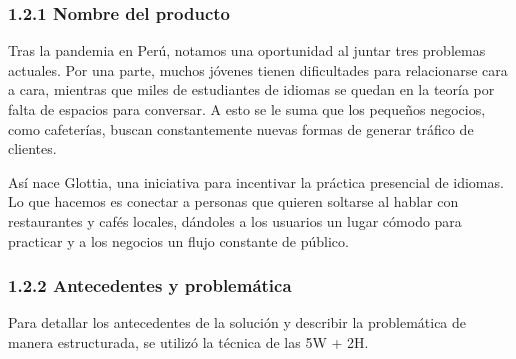 \subsubsection{1.2.1 Nombre del
producto}\label{report__10-cap1-introduccion.md__nombre-del-producto}

Tras la pandemia en Perú, notamos una oportunidad al juntar tres
problemas actuales. Por una parte, muchos jóvenes tienen dificultades
para relacionarse cara a cara, mientras que miles de estudiantes de
idiomas se quedan en la teoría por falta de espacios para conversar. A
esto se le suma que los pequeños negocios, como cafeterías, buscan
constantemente nuevas formas de generar tráfico de clientes.

Así nace Glottia, una iniciativa para incentivar la práctica presencial
de idiomas. Lo que hacemos es conectar a personas que quieren soltarse
al hablar con restaurantes y cafés locales, dándoles a los usuarios un
lugar cómodo para practicar y a los negocios un flujo constante de
público.

\subsubsection{1.2.2 Antecedentes y
problemática}\label{report__10-cap1-introduccion.md__antecedentes-y-problemuxe1tica}

Para detallar los antecedentes de la solución y describir la
problemática de manera estructurada, se utilizó la técnica de las 5W +
2H.

